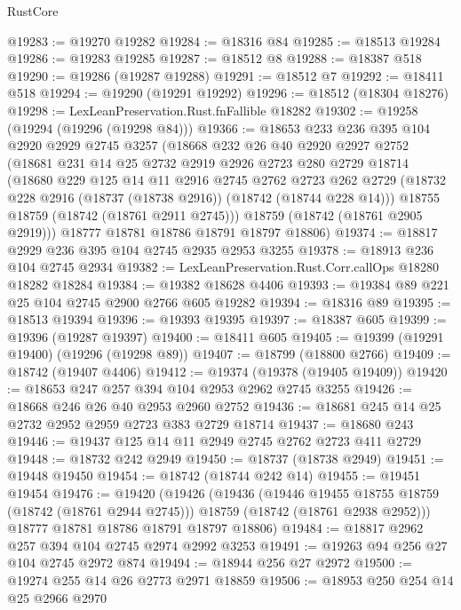 \begin{lexlean}{RustCore}
\begin{coremodule}
@19283 := @19270 @19282
@19284 := @18316 @84
@19285 := @18513 @19284
@19286 := @19283 @19285
@19287 := @18512 @8
@19288 := @18387 @518
@19290 := @19286 (@19287 @19288)
@19291 := @18512 @7
@19292 := @18411 @518
@19294 := @19290 (@19291 @19292)
@19296 := @18512 (@18304 @18276)
@19298 := LexLeanPreservation.Rust.fnFallible @18282
@19302 := @19258 (@19294 (@19296 (@19298 @84)))
@19366 := @18653
    @233
    @236
    @395
    @104
    @2920
    @2929
    @2745
    @3257
    (@18668
      @232
      @26
      @40
      @2920
      @2927
      @2752
      (@18681
        @231
        @14
        @25
        @2732
        @2919
        @2926
        @2723
        @280
        @2729
        @18714
        (@18680
          @229
          @125
          @14
          @11
          @2916
          @2745
          @2762
          @2723
          @262
          @2729
          (@18732 @228 @2916 (@18737 (@18738 @2916)) (@18742 (@18744 @228 @14)))
          @18755
          @18759
          (@18742 (@18761 @2911 @2745)))
        @18759
        (@18742 (@18761 @2905 @2919)))
      @18777
      @18781
      @18786
      @18791
      @18797
      @18806)
@19374 := @18817 @2929 @236 @395 @104 @2745 @2935 @2953 @3255
@19378 := @18913 @236 @104 @2745 @2934
@19382 := LexLeanPreservation.Rust.Corr.callOps @18280 @18282 @18284
@19384 := @19382 @18628 @4406
@19393 := @19384 @89 @221 @25 @104 @2745 @2900 @2766 @605 @19282
@19394 := @18316 @89
@19395 := @18513 @19394
@19396 := @19393 @19395
@19397 := @18387 @605
@19399 := @19396 (@19287 @19397)
@19400 := @18411 @605
@19405 := @19399 (@19291 @19400) (@19296 (@19298 @89))
@19407 := @18799 (@18800 @2766)
@19409 := @18742 (@19407 @4406)
@19412 := @19374 (@19378 (@19405 @19409))
@19420 := @18653 @247 @257 @394 @104 @2953 @2962 @2745 @3255
@19426 := @18668 @246 @26 @40 @2953 @2960 @2752
@19436 := @18681 @245 @14 @25 @2732 @2952 @2959 @2723 @383 @2729 @18714
@19437 := @18680 @243
@19446 := @19437 @125 @14 @11 @2949 @2745 @2762 @2723 @411 @2729
@19448 := @18732 @242 @2949
@19450 := @18737 (@18738 @2949)
@19451 := @19448 @19450
@19454 := @18742 (@18744 @242 @14)
@19455 := @19451 @19454
@19476 := @19420
    (@19426
      (@19436
        (@19446 @19455 @18755 @18759 (@18742 (@18761 @2944 @2745)))
        @18759
        (@18742 (@18761 @2938 @2952)))
      @18777
      @18781
      @18786
      @18791
      @18797
      @18806)
@19484 := @18817 @2962 @257 @394 @104 @2745 @2974 @2992 @3253
@19491 := @19263 @94 @256 @27 @104 @2745 @2972 @874
@19494 := @18944 @256 @27 @2972
@19500 := @19274 @255 @14 @26 @2773 @2971 @18859
@19506 := @18953 @250 @254 @14 @25 @2966 @2970

\end{coremodule}
\end{lexlean}
